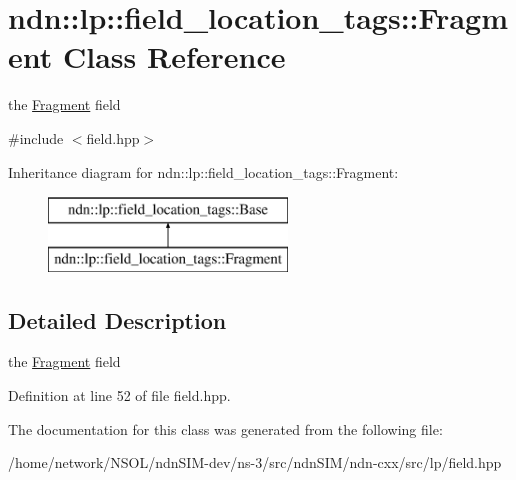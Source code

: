\hypertarget{classndn_1_1lp_1_1field__location__tags_1_1Fragment}{}\section{ndn\+:\+:lp\+:\+:field\+\_\+location\+\_\+tags\+:\+:Fragment Class Reference}
\label{classndn_1_1lp_1_1field__location__tags_1_1Fragment}


the \hyperlink{classndn_1_1lp_1_1field__location__tags_1_1Fragment}{Fragment} field  




{\ttfamily \#include $<$field.\+hpp$>$}

Inheritance diagram for ndn\+:\+:lp\+:\+:field\+\_\+location\+\_\+tags\+:\+:Fragment\+:\begin{figure}[H]
\begin{center}
\leavevmode
\includegraphics[height=2.000000cm]{classndn_1_1lp_1_1field__location__tags_1_1Fragment}
\end{center}
\end{figure}


\subsection{Detailed Description}
the \hyperlink{classndn_1_1lp_1_1field__location__tags_1_1Fragment}{Fragment} field 

Definition at line 52 of file field.\+hpp.



The documentation for this class was generated from the following file\+:\begin{DoxyCompactItemize}
\item 
/home/network/\+N\+S\+O\+L/ndn\+S\+I\+M-\/dev/ns-\/3/src/ndn\+S\+I\+M/ndn-\/cxx/src/lp/field.\+hpp\end{DoxyCompactItemize}
